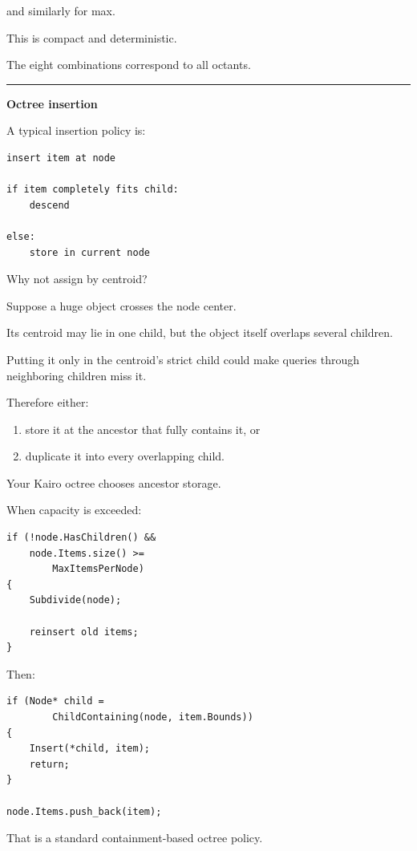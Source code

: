 and similarly for max.

This is compact and deterministic.

The eight combinations correspond to all octants.

\begin{center}\rule{0.5\linewidth}{0.5pt}\end{center}

\textbf{Octree insertion}

A typical insertion policy is:

\begin{verbatim}
insert item at node

if item completely fits child:
    descend

else:
    store in current node
\end{verbatim}

Why not assign by centroid?

Suppose a huge object crosses the node center.

Its centroid may lie in one child, but the object itself overlaps several children.

Putting it only in the centroid's strict child could make queries through neighboring children miss it.

Therefore either:

\begin{enumerate}
\def\labelenumi{\arabic{enumi}.}
\tightlist
\item
  store it at the ancestor that fully contains it, or
\item
  duplicate it into every overlapping child.
\end{enumerate}

Your Kairo octree chooses ancestor storage.

When capacity is exceeded:

\begin{verbatim}
if (!node.HasChildren() &&
    node.Items.size() >=
        MaxItemsPerNode)
{
    Subdivide(node);

    reinsert old items;
}
\end{verbatim}

Then:

\begin{verbatim}
if (Node* child =
        ChildContaining(node, item.Bounds))
{
    Insert(*child, item);
    return;
}

node.Items.push_back(item);
\end{verbatim}

That is a standard containment-based octree policy.

